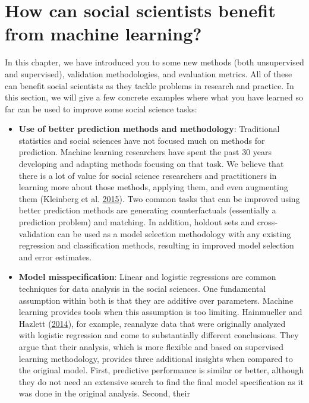 \documentclass[]{krantz}
\begin{document}
\section{How can social scientists benefit from machine
learning?}\label{how-can-social-scientists-benefit-from-machine-learning}

In this chapter, we have introduced you to some new methods (both
unsupervised and supervised), validation methodologies, and evaluation
metrics. All of these can benefit social scientists as they tackle
problems in research and practice. In this section, we will give a few
concrete examples where what you have learned so far can be used to
improve some social science tasks:

\begin{itemize}
\item
  \textbf{Use of better prediction methods and methodology}: Traditional
  statistics and social sciences have not focused much on methods for
  prediction. Machine learning researchers have spent the past 30 years
  developing and adapting methods focusing on that task. We believe that
  there is a lot of value for social science researchers and
  practitioners in learning more about those methods, applying them, and
  even augmenting them (Kleinberg et al.
  \protect\hyperlink{ref-Kleinberg2015}{2015}). Two common tasks that
  can be improved using better prediction methods are generating
  counterfactuals (essentially a prediction problem) and matching. In
  addition, holdout sets and cross-validation can be used as a model
  selection methodology with any existing regression and classification
  methods, resulting in improved model selection and error estimates.
\item
  \textbf{Model misspecification}: Linear and logistic regressions are
  common techniques for data analysis in the social sciences. One
  fundamental assumption within both is that they are additive over
  parameters. Machine learning provides tools when this assumption is
  too limiting. Hainmueller and Hazlett
  (\protect\hyperlink{ref-hainmueller2014kernel}{2014}), for example,
  reanalyze data that were originally analyzed with logistic regression
  and come to substantially different conclusions. They argue that their
  analysis, which is more flexible and based on supervised learning
  methodology, provides three additional insights when compared to the
  original model. First, predictive performance is similar or better,
  although they do not need an extensive search to find the final model
  specification as it was done in the original analysis. Second, their

\end{itemize}
\end{document}
